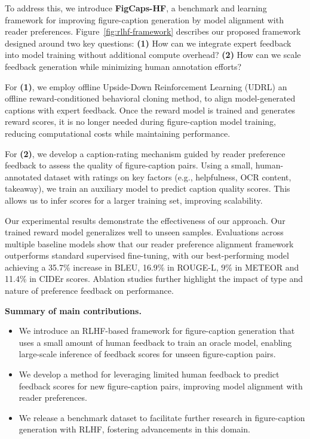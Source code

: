 \documentclass[11pt]{article}
\begin{document}
To address this, we introduce \textbf{FigCaps-HF}, a benchmark and learning framework for improving figure-caption generation by model alignment with reader preferences. Figure~\ref{fig:rlhf-framework} describes our proposed framework designed around two key questions:
\textbf{(1)} How can we integrate expert feedback into model training without additional compute overhead?
\textbf{(2)} How can we scale feedback generation while minimizing human annotation efforts?


For \textbf{(1)}, we employ offline Upside-Down Reinforcement Learning (UDRL) an offline reward-conditioned behavioral cloning method, to align model-generated captions with expert feedback. Once the reward model is trained and generates reward scores, it is no longer needed during figure-caption model training, reducing computational costs while maintaining performance.

For \textbf{(2)}, we develop a caption-rating mechanism guided by reader preference feedback to assess the quality of figure-caption pairs. Using a small, human-annotated dataset with ratings on key factors (e.g., helpfulness, OCR content, takeaway), we train an auxiliary model to predict caption quality scores. This allows us to infer scores for a larger training set, improving scalability. 

Our experimental results demonstrate the effectiveness of our approach. Our trained reward model generalizes well to unseen samples. Evaluations across multiple baseline models show that our reader preference alignment framework outperforms standard supervised fine-tuning, with our best-performing model achieving a 35.7\% increase in BLEU, 16.9\% in ROUGE-L, 9\% in METEOR and 11.4\% in CIDEr scores. Ablation studies further highlight the impact of type and nature of preference feedback on performance.

\medskip\noindent\textbf{Summary of main contributions.} 
\begin{itemize}[leftmargin=*]
\itemsep0em 
\item We introduce an RLHF-based framework for figure-caption generation that uses a small amount of human feedback to train an oracle model, enabling large-scale inference of feedback scores for unseen figure-caption pairs.
\item We develop a method for leveraging limited human feedback to predict feedback scores for new figure-caption pairs, improving model alignment with reader preferences.
\item We release a benchmark dataset to facilitate further research in figure-caption generation with RLHF, fostering advancements in this domain.
\end{itemize}
\end{document}
